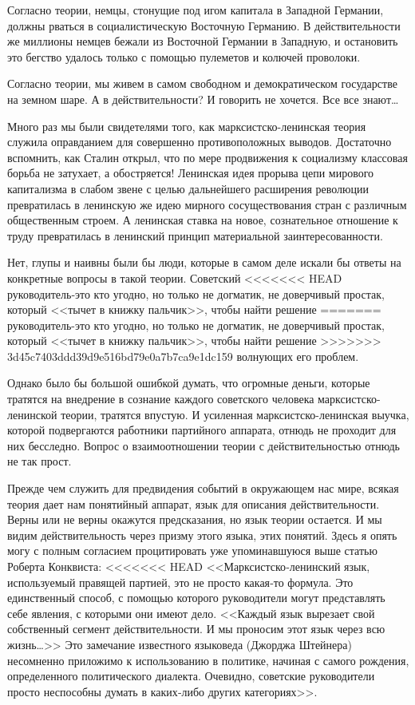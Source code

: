 \documentclass{book}
\begin{document}
Согласно теории, немцы, стонущие под игом капитала в За­падной Германии, должны рваться в социалистическую Восточ­ную Германию. В 
действительности же миллионы немцев бежа­ли из Восточной Германии в Западную, и остановить это бегст­во удалось только с помощью 
пулеметов и колючей прово­локи.

Согласно теории, мы живем в самом свободном и демокра­тическом государстве на земном шаре. А в действительности? И говорить не 
хочется. Все все знают\ldots

Много раз мы были свидетелями того, как марксистско-ленинская теория служила оправданием для совершенно противоположных выводов. 
Достаточно вспомнить, как Сталин открыл, что по мере продвижения к социализму классовая борьба не затухает, а обостряется! 
Ленинская идея прорыва цепи мирового капитализма в слабом звене с целью дальней­шего расширения революции превратилась в 
ленинскую же идею мирного сосуществования стран с различным общест­венным строем. А ленинская ставка на новое, сознательное 
отношение к труду превратилась в ленинский принцип мате­риальной заинтересованности.

Нет, глупы и наивны были бы люди, которые в самом деле искали бы ответы на конкретные вопросы в такой теории. Советский 
<<<<<<< HEAD
руководитель‑это кто угодно, но только не догма­тик, не доверчивый простак, который <<тычет в книжку паль­чик>>, чтобы найти решение 
=======
руководитель-это кто угодно, но только не догма­тик, не доверчивый простак, который <<тычет в книжку паль­чик>>, чтобы найти решение 
>>>>>>> 3d45c7403ddd39d9e516bd79e0a7b7ca9e1dc159
волнующих его проблем.

Однако было бы большой ошибкой думать, что огромные деньги, которые тратятся на внедрение в сознание каждого советского человека 
марксистско-ленинской теории, тратятся впустую. И усиленная марксистско-ленинская выучка, кото­рой подвергаются работники 
партийного аппарата, отнюдь не проходит для них бесследно. Вопрос о взаимоотношении тео­рии с действительностью отнюдь не так 
прост.

Прежде чем служить для предвидения событий в окружаю­щем нас мире, всякая теория дает нам понятийный аппарат, язык для описания 
действительности. Верны или не верны окажутся предсказания, но язык теории остается. И мы видим действительность через призму 
этого языка, этих понятий. Здесь я опять могу с полным согласием процитировать уже упоминавшуюся выше статью Роберта Конквиста:
<<<<<<< HEAD
<<Марксистско‑ленинский язык, используемый правящей пар­тией, это не просто какая‑то формула. Это единственный спо­соб, с помощью 
которого руководители могут представлять себе явления, с которыми они имеют дело. <<Каждый язык вырезает свой собственный сегмент 
действительности. И мы проносим этот язык через всю жизнь\ldots>> Это замечание извест­ного языковеда (Джорджа Штейнера) 
несомненно приложимо к использованию в политике, начиная с самого рождения, опре­деленного политического диалекта. Очевидно, 
советские ру­ководители просто неспособны думать в каких‑либо других категориях>>.
\end{document}
